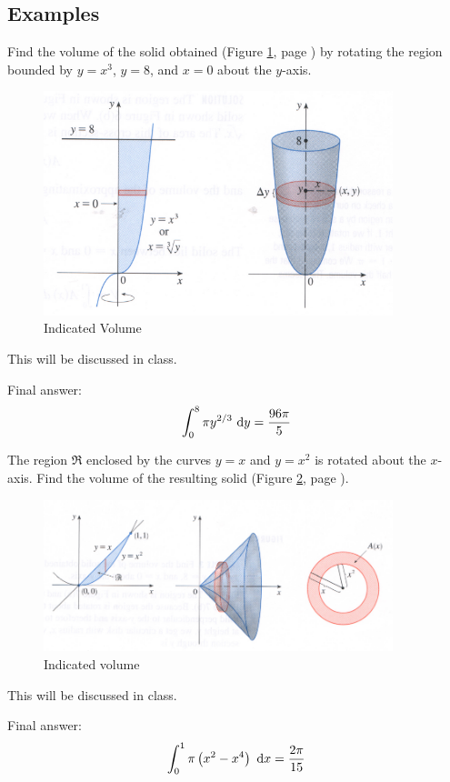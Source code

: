 \documentclass[12pt,addpoints, answers, fleqn]{exam}
\begin{document}
\subsection{Examples}
\begin{questions}
\question Find the volume of the solid obtained (Figure \ref{fig:graph3109}, page \pageref{fig:graph3109}) by rotating the region bounded by $y=x^3$, $y=8$, and $x=0$ about the $y$-axis.
\begin{figure}[htbp] %
   \centering
   \includegraphics[width=4in]{./graphics/graph3109.pdf} 
   \caption{Indicated Volume}
   \label{fig:graph3109}
\end{figure}


\begin{solution}
This will be discussed in class.

Final answer:
\[
 \int_0^8 \pi y^{2/3} \ {\rm{d}} y = \frac{96\pi}{5}
\]
\end{solution}

\question The region $\Re$ enclosed by the curves $y=x$ and $y=x^2$ is rotated about the $x$-axis. Find the volume of the resulting solid (Figure \ref{fig:graph3110}, page \pageref{fig:graph3110}).
\begin{figure}[htbp] %
   \centering
   \includegraphics[width=4in]{./graphics/graph3110.pdf} 
   \caption{Indicated volume}
   \label{fig:graph3110}
\end{figure}

\begin{solution}
This will be discussed in class.

Final answer:
\[
\int_0^1 \pi \left( x^2 - x^4 \right) \ {\rm{d}} x = \frac{2\pi}{15}
\]
\end{solution}
\end{questions}
\end{document}
